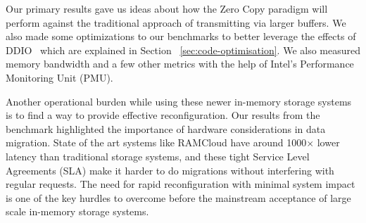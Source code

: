 Our primary results gave us ideas about how the Zero Copy paradigm will perform against
the traditional approach of transmitting via larger buffers. We also made some optimizations to our 
benchmarks to better leverage the effects of DDIO~\cite{ddio} which are explained in Section ~\ref{sec:code-optimisation}. 
We also measured memory bandwidth and a few other metrics with the help of Intel\textregistered's Performance Monitoring Unit (PMU).

Another operational burden while using these newer in-memory storage systems is to find a way to 
provide effective reconfiguration. Our results from the benchmark highlighted the importance of 
hardware considerations in data migration. State of the art systems like RAMCloud have around 1000$\times$
lower latency than traditional storage systems, and these tight Service Level Agreements (SLA) make it harder to do migrations
without interfering with regular requests. The need for rapid reconfiguration with minimal system 
impact is one of the key hurdles to overcome before the mainstream acceptance of large scale 
in-memory storage systems.

